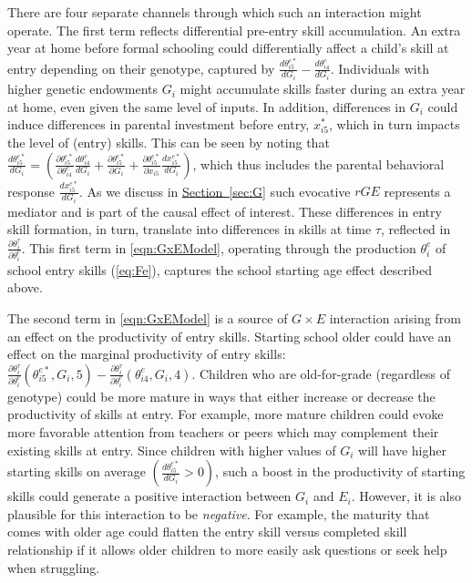 \documentclass[12pt,a4paper]{article}
\begin{document}
\begin{bibunit}
There are four separate channels through which such an interaction might operate.  The first term reflects differential pre-entry skill accumulation.  An extra year at home before formal schooling could differentially affect a child's skill at entry depending on their genotype, captured by $\frac{d \theta_{i 5}^{e*}}{d G_i} - \frac{d \theta_{i 4}^e}{d G_i}$.  Individuals with higher genetic endowments $G_{i}$ might accumulate skills faster during an extra year at home, even given the same level of inputs. In addition, differences in $G_{i}$ could induce differences in parental investment before entry, $x_{i5}^{*}$, which in turn impacts the level of (entry) skills.  This can be seen by noting that $\frac{d \theta_{i 5}^{e*}}{d G_i}=\left(\frac{\partial \theta_{i5}^{e*}}{\partial \theta_{i4}^{e}}\frac{d \theta_{i4}^{e}}{d G_{i}}+\frac{\partial \theta_{i5}^{e*}}{\partial G_{i}}+\frac{\partial \theta_{i5}^{e*}}{\partial x_{i5}}\frac{d x_{i5}^{e*}}{d G_{i}}\right)$, which thus includes the parental behavioral response $\frac{d x_{i5}^{e*}}{d G_{i}}$.  As we discuss in \hyperref[sec:G]{Section~\ref*{sec:G}} such evocative $rGE$ represents a mediator and is part of the causal effect of interest. These differences in entry skill formation, in turn, translate into differences in skills at time $\tau$, reflected in $\frac{\partial \theta_{i}^\tau}{\partial \theta_{i}^e}$. This first term in \autoref{eqn:GxEModel}, operating through the production $\theta_{i}^e$ of school entry skills (\autoref{eq:Fe}), captures the school starting age effect described above.

The second term in \autoref{eqn:GxEModel} is a source of $G\times{}E$ interaction arising from an effect on the productivity of entry skills.  Starting school older could have an effect on the marginal productivity of entry skills: $\frac{\partial \theta_{i}^\tau}{\partial \theta_{i}^e}(\theta_{i5}^{e*}, G_{i}, 5)-\frac{\partial \theta_{i}^\tau}{\partial \theta_{i}^e}(\theta_{i 4}^e, G_{i},4)$.  Children who are old-for-grade (regardless of genotype) could be more mature in ways that either increase or decrease the productivity of skills at entry.  For example, more mature children could evoke more favorable attention from teachers or peers which may complement their existing skills at entry.  Since children with higher values of $G_{i}$ will have higher starting skills on average $\left(\frac{d \theta_{i 5}^{e *}}{d G_{i}}>0\right)$, such a boost in the productivity of starting skills could generate a positive interaction between $G_{i}$ and $E_{i}$.  However, it is also plausible for this interaction to be \textit{negative}.  For example, the maturity that comes with older age could  flatten the entry skill versus completed skill relationship if it allows older children to more easily ask questions or seek help when struggling.


\end{bibunit}
\end{document}
